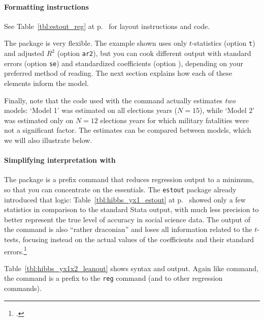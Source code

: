 \paragraph{Formatting instructions} See Table~\ref{tbl:estout_reg} at p.~\pageref{tbl:estout_reg} for layout instructions and code.

The  package is very flexible. The example shown uses only $t$-statistics (option \texttt{t}) and adjusted $R^2$ (option \texttt{ar2}), but you can cook different output with standard errors (option \texttt{se}) and standardized coefficients (option ), depending on your preferred method of reading. The next section explains how each of these elements inform the model.

Finally, note that the code used with the  command actually estimates \emph{two} models: `Model 1' was estimated on all elections years ($N=15$), while `Model 2' was estimated only on $N=12$ elections years for which military fatalities were not a significant factor. The estimates can be compared between models, which we will also illustrate below.

	
	\paragraph{Simplifying interpretation with }%
	\label{sec:leanout}
	The  package is a prefix command that reduces regression output to a minimum, so that you can concentrate on the essentials. The \texttt{estout} package already introduced that logic: Table~\ref{tbl:hibbs_yx1_estout} at p.~\pageref{tbl:hibbs_yx1_estout} showed only a few statistics in comparison to the standard Stata output, with much less precision to better represent the true level of accuracy in social science data. The output of the  command is also ``rather draconian'' and loses all information related to the $t$-tests, focusing instead on the actual values of the coefficients and their standard errors.\footcite{Beck:2011a}

	Table~\ref{tbl:hibbs_yx1x2_leanout} shows  syntax and output. Again like  command, the  command is a prefix to the \texttt{reg} command (and to other regression commands).
	
